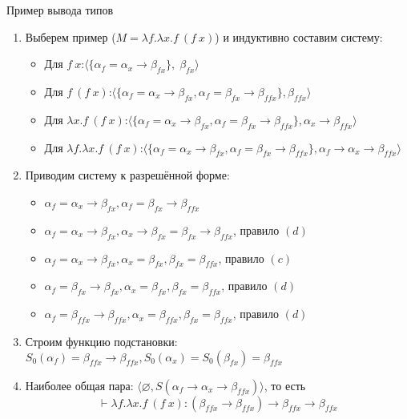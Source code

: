 \documentclass[aspectratio=169]{beamer}
\begin{document}
\begin{frame}{Пример вывода типов }
\begin{enumerate}
\item Выберем пример ($M = \lambda f.\lambda x.f\ (f\ x)$) и индуктивно составим систему:
\begin{itemize}
\item Для $f\ x$:\quad $\langle\{\alpha_f = \alpha_x\rightarrow\beta_{fx}\},\; \beta_{fx}\rangle$
\item Для $f\ (f\ x)$:\quad $\langle\{\alpha_f = \alpha_x\rightarrow\beta_{fx}, \alpha_f = \beta_{fx}\rightarrow\beta_{ffx}\}, \beta_{ffx}\rangle$
\item Для $\lambda x.f\ (f\ x)$:\quad $\langle\{\alpha_f = \alpha_x\rightarrow\beta_{fx}, \alpha_f = \beta_{fx}\rightarrow\beta_{ffx}\}, \alpha_x\rightarrow\beta_{ffx}\rangle$
\item Для $\lambda f.\lambda x.f\ (f\ x)$:\quad $\langle\{\alpha_f = \alpha_x\rightarrow\beta_{fx}, \alpha_f = \beta_{fx}\rightarrow\beta_{ffx}\}, \alpha_f\rightarrow\alpha_x\rightarrow\beta_{ffx}\rangle$
\end{itemize}
\item Приводим систему к разрешённой форме:
\begin{itemize}
\item $\alpha_f = \alpha_x\rightarrow\beta_{fx}, \alpha_f = \beta_{fx}\rightarrow\beta_{ffx}$
\item $\alpha_f = \alpha_x\rightarrow\beta_{fx}, \alpha_x\rightarrow\beta_{fx} = \beta_{fx}\rightarrow\beta_{ffx}$, правило $(d)$
\item $\alpha_f = \alpha_x\rightarrow\beta_{fx}, \alpha_x = \beta_{fx}, \beta_{fx} = \beta_{ffx}$, правило $(c)$
\item $\alpha_f = \beta_{fx}\rightarrow\beta_{fx}, \alpha_x = \beta_{fx}, \beta_{fx} = \beta_{ffx}$, правило $(d)$
\item $\alpha_f = \beta_{ffx}\rightarrow\beta_{ffx}, \alpha_x = \beta_{ffx}, \beta_{fx} = \beta_{ffx}$, правило $(d)$
\end{itemize}
\item Строим функцию подстановки:
$S_0(\alpha_f) = \beta_{ffx}\rightarrow\beta_{ffx}, S_0(\alpha_x) = S_0(\beta_{fx}) = \beta_{ffx}$
\item Наиболее общая пара:
$\langle \varnothing, S(\alpha_f\rightarrow\alpha_x\rightarrow\beta_{ffx})\rangle$, то есть
$$\vdash \lambda f.\lambda x.f\ (f\ x) : (\beta_{ffx}\rightarrow\beta_{ffx})\rightarrow\beta_{ffx}\rightarrow\beta_{ffx}$$
\end{enumerate}
\end{frame}
\end{document}

